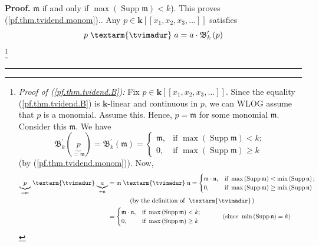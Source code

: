 \documentclass[numbers=enddot,12pt,final,onecolumn,notitlepage,abstracton]{scrartcl}%
\theoremstyle{definition}
\newenvironment{proof}[1][Proof]{\noindent\textbf{#1.} }{\ \rule{0.5em}{0.5em}}
\newenvironment{verlong}{}{}
\newcommand{\tvi}{\left. \textarm{\tvimadur} \right.}
\begin{document}
\begin{verlong}
\begin{proof}
{$\mathfrak{m}$ if and only if $\max\left(  \operatorname*{Supp}\mathfrak{m}%
\right)  <k$). This proves (\ref{pf.thm.tvidend.monom}).}. Any $p\in
\mathbf{k}\left[  \left[  x_{1},x_{2},x_{3},\ldots\right]  \right]  $
satisfies%
\begin{equation}
p \tvi a=a\cdot\mathfrak{B}_{k}^{\prime}\left(  p\right)
\label{pf.thm.tvidend.B}%
\end{equation}
\footnote{\textit{Proof of (\ref{pf.thm.tvidend.B}):} Fix $p\in\mathbf{k}%
\left[  \left[  x_{1},x_{2},x_{3},\ldots\right]  \right]  $. Since the
equality (\ref{pf.thm.tvidend.B}) is $\mathbf{k}$-linear and continuous in
$p$, we can WLOG assume that $p$ is a monomial. Assume this. Hence,
$p=\mathfrak{m}$ for some monomial $\mathfrak{m}$. Consider this
$\mathfrak{m}$. We have%
\begin{equation}
\mathfrak{B}_{k}^{\prime}\left(  \underbrace{p}_{=\mathfrak{m}}\right)
=\mathfrak{B}_{k}^{\prime}\left(  \mathfrak{m}\right)  =
\begin{cases}
\mathfrak{m}, & \text{if }\max\left(  \operatorname*{Supp}\mathfrak{m}\right)
<k;\\
0, & \text{if }\max\left(  \operatorname*{Supp}\mathfrak{m}\right)  \geq k
\end{cases}
\label{pf.thm.tvidend.B.pf.2}%
\end{equation}
(by (\ref{pf.thm.tvidend.monom})). Now,%
\begin{align*}
\underbrace{p}_{=\mathfrak{m}} \tvi \underbrace{a}_{=\mathfrak{n}}  &
=\mathfrak{m} \tvi \mathfrak{n}=
\begin{cases}
\mathfrak{m}\cdot\mathfrak{n}, & \text{if }\max\left(  \operatorname*{Supp}%
\mathfrak{m}\right)  <\min\left(  \operatorname*{Supp}\mathfrak{n}\right)  ;\\
0, & \text{if }\max\left(  \operatorname*{Supp}\mathfrak{m}\right)  \geq
\min\left(  \operatorname*{Supp}\mathfrak{n}\right)
\end{cases}
\\
&  \ \ \ \ \ \ \ \ \ \ \left(  \text{by the definition of } \tvi \right) \\
&  =
\begin{cases}
\mathfrak{m}\cdot\mathfrak{n}, & \text{if }\max\left(  \operatorname*{Supp}%
\mathfrak{m}\right)  <k;\\
0, & \text{if }\max\left(  \operatorname*{Supp}\mathfrak{m}\right)  \geq k
\end{cases}
\ \ \ \ \ \ \ \ \ \ \left(  \text{since }\min\left(  \operatorname*{Supp}%
\mathfrak{n}\right)  =k\right) \\

\end{align*}}
\end{proof}
\end{verlong}
\end{document}
